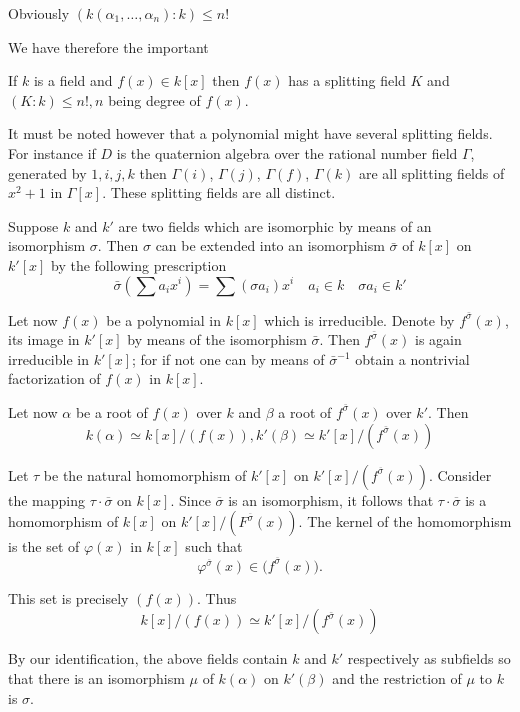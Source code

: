 Obviously $(k(\alpha_1 ,\ldots , \alpha_n):k) \leq n !$

We have therefore the important

\begin{thm}\label{c1:thm3}%
If $k$ is a field and $f(x) \in k[x]$ then $f(x)$ 
  has a splitting field $K$ and $(K:k) \leq n !, n$ being degree of
  $f(x)$. 
\end{thm}

It must be noted however that a polynomial might have several
splitting fields. For instance if $D$ is the quaternion algebra over
the rational number field $\Gamma$, generated by $1, i, j,k$ then
$\Gamma (i)$, $\Gamma(j)$, $\Gamma (f)$, $\Gamma (k)$ are all
splitting fields of $x^2 
+1 $ in $\Gamma [x]$. These splitting fields are all distinct. 

Suppose $k$ and $k'$ are two fields which are isomorphic by means of
an isomorphism $\sigma$. Then $\sigma$ can be extended into an
isomorphism $\bar{\sigma}$ of $k[x]$ on $k'[x]$ by the following
prescription   
$$
\bar{\sigma}(\sum a_i x^i) = \sum (\sigma a_i )x^i \quad  a_i \in k
\quad \sigma a_i \in k'  
$$

Let now $f(x)$  be a polynomial in $k[x]$ which is irreducible. Denote
by $f^{\bar{\sigma}} (x)$, its image in $k'[x]$ by means of the
isomorphism $\bar{\sigma}$. Then $f^{\bar{\sigma}}(x)$ is again
irreducible in $k'[x]$; for if not one can by means of
$\bar{\sigma}^{-1}$ obtain a nontrivial factorization of $f(x)$ in
$k[x]$. 

Let now $\alpha$ be a root of $f(x)$ over $k$ and $\beta$ a root of
$f^{\bar{\sigma}}(x)$ over $k'$. Then 
$$
k(\alpha ) \simeq k[x] / (f(x)) , k' (\beta) \simeq k' [x] /
(f^{\bar{\sigma}}(x)) 
$$

Let $\tau$ be the natural homomorphism of $k'[x]$ on $k'[x] /
(f^{\overline{\sigma}}(x))$. Consider the mapping $\tau \cdot
\overline{\sigma}$ on 
$k[x]$. Since $\overline{\sigma}$ is an isomorphism, it follows that
$\tau \cdot \overline{\sigma}$ is a homomorphism of $k[x]$ on $k'[x] /
(F^{\overline{\sigma}} (x))$. The kernel of the homomorphism is the set of
$\varphi (x)$ in $k[x]$ such that 
$$
\varphi^{\overline{\sigma}} ( x )\in  \bigg( f^{\overline{\sigma}} ( x
) \bigg). 
$$\pageoriginale

This set is precisely  $ ( f ( x) ) $. Thus 
$$
k [ x ] /  ( f (x) ) \simeq k' [ x ]/ ( f^{\bar{\sigma}} (x) ) 
$$ 

By our identification, the above fields contain $k$ and $ k'$
respectively as subfields so that there is an isomorphism $ \mu $ of
$ k ( \alpha ) $ on $ k' ( \beta ) $ and  the restriction of $\mu$ to
$k$ is $ \sigma $. 

